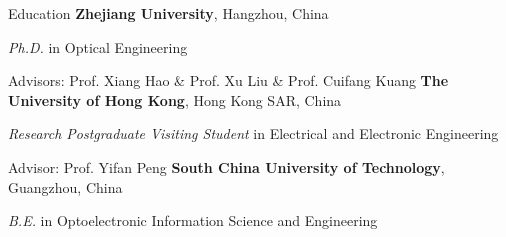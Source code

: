 \begin{rubric}{Education}
	\entry*[2018/09 -- 2023/12]%
	\textbf{Zhejiang University}, Hangzhou, China
	\par \textit{Ph.D.} in Optical Engineering
	\par Advisors: Prof. Xiang Hao \& Prof. Xu Liu \& Prof. Cuifang Kuang
	\entry*[2022/12 -- 2023/03]%
	\textbf{The University of Hong Kong}, Hong Kong SAR, China
	\par \textit{Research Postgraduate Visiting Student} in Electrical and Electronic Engineering
	\par Advisor: Prof. Yifan Peng
	\entry*[2014/09 -- 2018/06]%
	\textbf{South China University of Technology}, Guangzhou, China
	\par \textit{B.E.} in Optoelectronic Information Science and Engineering
\end{rubric}